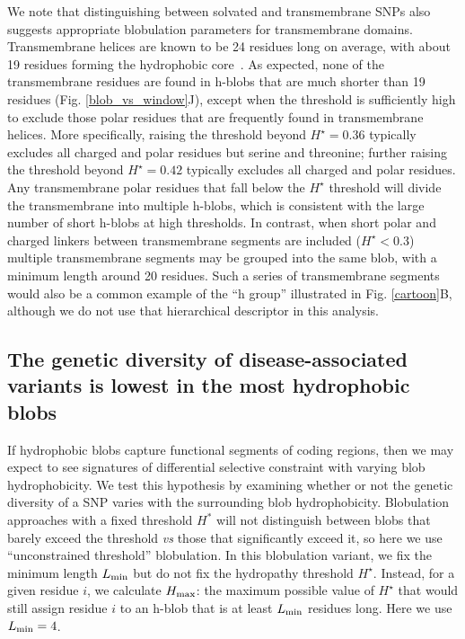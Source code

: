 \documentclass[9pt,twocolumn,twoside,lineno]{pnas-new}
\newcommand{\aucomment}[1]{}
\newcommand{\inserted}[1]{{#1}}
\newcommand{\cmax}{H_{\rm max}}
\newcommand{\Ht}{H^{\star}}
\newcommand{\Lmin}{L_{\rm min}}
\begin{document}
\inserted{We note that distinguishing between solvated and transmembrane SNPs also suggests appropriate blobulation parameters for transmembrane domains. Transmembrane helices are known to be 24 residues long on average, with about 19 residues forming the hydrophobic core~\cite{BaezaDelgado2013}. As expected, none of the transmembrane residues are found in h-blobs that are much shorter than 19 residues (Fig. \ref{blob_vs_window}J), except when the threshold is sufficiently high to exclude those polar residues that are frequently found in transmembrane helices.  More specifically, raising the threshold beyond $\Ht=0.36$ typically excludes all charged and polar residues but serine and threonine; further raising the threshold beyond $\Ht=0.42$ typically excludes all charged and polar residues. Any transmembrane polar residues that fall below the $\Ht$ threshold will divide the transmembrane into multiple h-blobs, which is consistent with the large number of short h-blobs at high thresholds. In contrast, when short polar and charged linkers between transmembrane segments are included ($\Ht<0.3$) multiple transmembrane segments may be grouped into the same blob, with a minimum length around 20 residues. Such a series of transmembrane segments would also be a common example of the ``h group'' illustrated in Fig. \ref{cartoon}B, although we do not use that hierarchical descriptor in this analysis.}

\subsection*{The genetic diversity of disease-associated variants is lowest in the most hydrophobic blobs}
\aucomment{Minor edits were made to this section for clarity and to reduce repetition}
If hydrophobic blobs capture functional segments of coding regions, then we may expect to see signatures of differential selective constraint with varying blob hydrophobicity. We test this hypothesis by examining whether or not the genetic diversity of a SNP varies with the surrounding blob hydrophobicity. Blobulation approaches with a fixed threshold $H^*$ will not distinguish between blobs that barely exceed the threshold {\it vs} those that significantly exceed it, so here we use ``unconstrained threshold'' blobulation. In this blobulation variant, we fix the minimum length $\Lmin$
but do not fix the hydropathy threshold $\Ht$. Instead, for a given residue $i$, we calculate $\cmax$: the maximum possible value of $\Ht$ that would still assign residue $i$ to an h-blob that is at least $\Lmin$ residues long. Here we use $\Lmin=4$.
\end{document}
